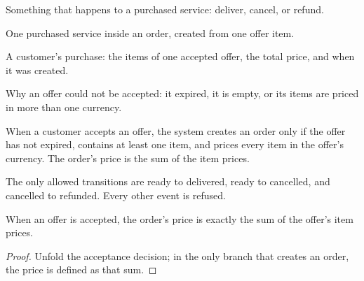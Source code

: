 \begin{definition}
  \label{def:delivery-event}
  Something that happens to a purchased service: deliver, cancel, or refund.
\end{definition}

\begin{definition}
  \label{def:order-item}
  One purchased service inside an order, created from one offer item.
\end{definition}

\begin{definition}[Order]
  \label{def:order}
  A customer's purchase: the items of one accepted offer, the total price, and
  when it was created.
\end{definition}

\begin{definition}[Rejection]
  \label{def:rejection}
  Why an offer could not be accepted: it expired, it is empty, or its items
  are priced in more than one currency.
\end{definition}

\begin{definition}
  \label{def:accept}
  When a customer accepts an offer, the system creates an order only if the
  offer has not expired, contains at least one item, and prices every item in
  the offer's currency.  The order's price is the sum of the item prices.
\end{definition}

\begin{definition}
  \label{def:step}
  The only allowed transitions are ready to delivered, ready to cancelled, and
  cancelled to refunded.  Every other event is refused.
\end{definition}

\begin{theorem}
  \label{thm:accept-price-eq-sum}
  When an offer is accepted, the order's price is exactly the sum of the
  offer's item prices.
\end{theorem}
\begin{proof}
  Unfold the acceptance decision; in the only branch that creates an order,
  the price is defined as that sum.
\end{proof}


